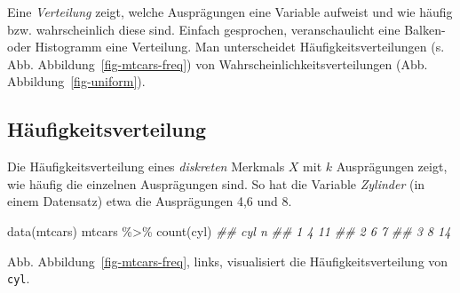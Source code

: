 \documentclass[
  a4paper,
  DIV=11]{scrreprt}
\newenvironment{Shaded}{\begin{snugshade}}{\end{snugshade}}
\newcommand{\DocumentationTok}[1]{\textcolor[rgb]{0.37,0.37,0.37}{\textit{#1}}}
\newcommand{\FunctionTok}[1]{\textcolor[rgb]{0.28,0.35,0.67}{#1}}
\newcommand{\NormalTok}[1]{\textcolor[rgb]{0.00,0.23,0.31}{#1}}
\newcommand{\SpecialCharTok}[1]{\textcolor[rgb]{0.37,0.37,0.37}{#1}}
\theoremstyle{definition}
\theoremstyle{remark}
\begin{document}
\begin{tcolorbox}[enhanced jigsaw, colframe=quarto-callout-important-color-frame, title=\textcolor{quarto-callout-important-color}{\faExclamation}\hspace{0.5em}{Wichtig}, breakable, leftrule=.75mm, coltitle=black, toptitle=1mm, bottomrule=.15mm, bottomtitle=1mm, opacityback=0, arc=.35mm, rightrule=.15mm, left=2mm, colbacktitle=quarto-callout-important-color!10!white, opacitybacktitle=0.6, toprule=.15mm, titlerule=0mm, colback=white]
Eine \emph{Verteilung} zeigt, welche Ausprägungen eine Variable aufweist
und wie häufig bzw. wahrscheinlich diese sind. Einfach gesprochen,
veranschaulicht eine Balken- oder Histogramm eine Verteilung. Man
unterscheidet Häufigkeitsverteilungen (s. Abb.
Abbildung~\ref{fig-mtcars-freq}) von Wahrscheinlichkeitsverteilungen
(Abb. Abbildung~\ref{fig-uniform}).
\end{tcolorbox}

\hypertarget{huxe4ufigkeitsverteilung}{%
\subsection{Häufigkeitsverteilung}\label{huxe4ufigkeitsverteilung}}

Die Häufigkeitsverteilung eines \emph{diskreten} Merkmals \(X\) mit
\(k\) Ausprägungen zeigt, wie häufig die einzelnen Ausprägungen sind. So
hat die Variable \emph{Zylinder} (in einem Datensatz) etwa die
Ausprägungen 4,6 und 8.

\begin{Shaded}
\begin{Highlighting}[]
\FunctionTok{data}\NormalTok{(mtcars)}
\NormalTok{  mtcars }\SpecialCharTok{\%\textgreater{}\%} 
    \FunctionTok{count}\NormalTok{(cyl)}
\DocumentationTok{\#\#   cyl  n}
\DocumentationTok{\#\# 1   4 11}
\DocumentationTok{\#\# 2   6  7}
\DocumentationTok{\#\# 3   8 14}
\end{Highlighting}
\end{Shaded}

Abb. Abbildung~\ref{fig-mtcars-freq}, links, visualisiert die
Häufigkeitsverteilung von \texttt{cyl}.
\end{document}
